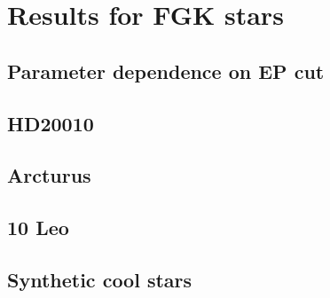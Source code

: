 \chapter{Results for FGK stars}
\label{cha:results}


\section{Parameter dependence on EP cut}
\label{sec:EPcut}


\section{HD20010}
\label{sec:HD20010}


\section{Arcturus}
\label{sec:arcturus}


\section{10 Leo}
\label{sec:10Leo}


\section{Synthetic cool stars}
\label{sec:synthetic_spectra}
